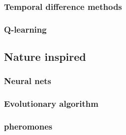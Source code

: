 \subsubsection{Temporal difference methods} 
\subsubsection{Q-learning} 


\subsection{Nature inspired} 

\subsubsection{Neural nets} 
\subsubsection{Evolutionary algorithm} 
\subsubsection{pheromones} 



